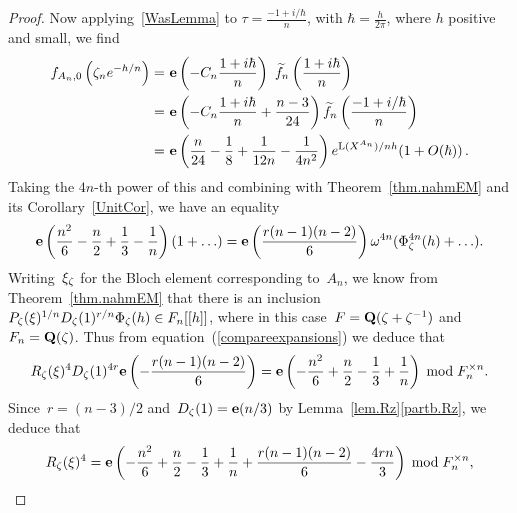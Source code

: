 \documentclass[12pt,reqno]{amsart}
\theoremstyle{definition}
\newcommand{\changed}[1]{{#1}}
\def\be{\begin{equation}}
\def\ee{\end{equation}}
\def\+{\,+\,}
\def\mod{\;\text{\rm mod}\;}
\def\Q{\mathbf Q}   %
\def\tf{\widetilde f}
\def\L{\mathrm L}
\def\nn{n}
\def\e{\mathbf{e}}
\begin{document}
\begin{proof}
Now applying~\eqref{WasLemma} to $\tau=\frac{-1+i/\hbar}{\nn}$, with 
$\hbar=\frac h{2\pi}$, where $h$ positive and small, we find  
\begin{equation}
\begin{aligned}
f_{A_\nn,0}\left(\z_\nn e^{-h/\nn}\right)
= & %
\ \e\left(-C_n\frac{1+i\hbar}\nn\right)
\  \tf_\nn\left(\frac{1+i\hbar}\nn\right) \\
= & %
\ \e\left(-C_n\frac{1+i\hbar}\nn+\frac{n-3}{24}\right) 
\tf_\nn \left(\frac{-1+i/\hbar}n\right) 
\\
\label{pfnc}
%
= & 
\  \e\left(\frac\nn{24}-\frac18+\frac1{12n}-\frac1{4n^2}\right)
  e^{\L(X^{A_\nn})/\nn h} (1+ O(\hbar)) \,.
\end{aligned}
\end{equation}
Taking the $4\nn$-th power of this and combining with Theorem~\ref{thm.nahmEM}
and its Corollary~\ref{UnitCor}, we 
\changed{have an equality
\be
\label{compareexpansions}
\e \left(\frac{n^2}{6} - \frac{n}{2} + \frac{1}{3} - \frac{1}{n} \right) (1 + \ldots)
= 
\e \left(\frac{r(n-1)(n-2)}{6} \right) \omega^{4n} 
(\Phi^{4n}_{\z}(h) + \ldots ).
 \ee
Writing~$\xi_{\zeta}$ for the Bloch element corresponding to~$A_n$,
we know from  Theorem~\ref{thm.nahmEM}
 that there is an inclusion~$P_{\zeta}(\xi)^{1/n} D_{\zeta}(1)^{r/n} \Phi_{\zeta}(h) \in F_n[[h]]$, where in
 this case~$F = \Q(\z + \z^{-1})$ and~$F_n = \Q(\z)$.  Thus from
 equation~(\ref{compareexpansions}) we deduce that
  $$R_{\z}(\xi)^4 D_{\z}(1)^{4r} \e \left(- \frac{r(n-1)(n-2)}{6} \right) 
 = \e  \left(- \frac{n^2}{6} + \frac{n}{2} - \frac{1}{3} + \frac{1}{n} \right)  \mod F^{\times n}_n.$$
Since~$r = (n-3)/2$ and~$D_{\z}(1) = \e(n/3)$ by Lemma~\ref{lem.Rz}\ref{partb.Rz},
we deduce that
  $$R_{\z}(\xi)^4  = 
   \e  \left(- \frac{n^2}{6} + \frac{n}{2} - \frac{1}{3} + \frac{1}{n}  + \frac{r(n-1)(n-2)}{6}  - \frac{4rn}{3} \right)
   \mod F^{\times n}_n,$$
}
\end{proof}
\end{document}
